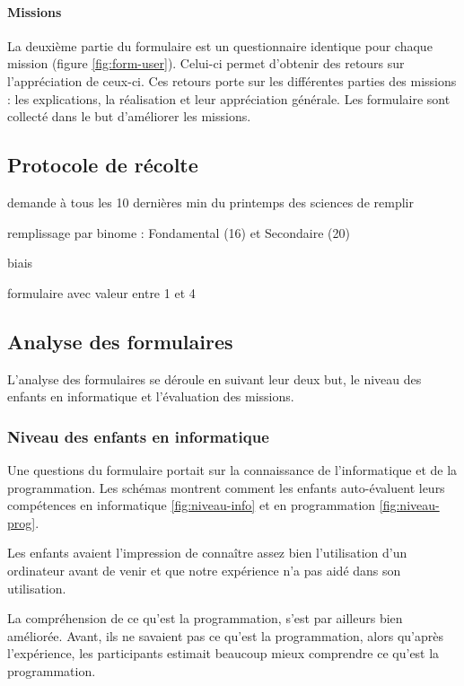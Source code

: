 \paragraph{Missions}
La deuxième partie du formulaire est un questionnaire identique pour chaque mission (figure \ref{fig:form-user}). Celui-ci permet d'obtenir des retours sur l'appréciation de ceux-ci. Ces retours porte sur les différentes parties des missions : les explications, la réalisation et leur appréciation générale. Les formulaire sont collecté dans le but d'améliorer les missions.

\subsection{Protocole de récolte}
demande à tous les 10 dernières min du printemps des sciences de remplir

remplissage par binome : Fondamental (16) et Secondaire (20)

biais

formulaire avec valeur entre 1 et 4

\subsection{Analyse des formulaires}
L'analyse des formulaires se déroule en suivant leur deux but, le niveau des enfants en informatique et l'évaluation des missions.

\subsubsection{Niveau des enfants en informatique}
Une questions du formulaire portait sur la connaissance de l'informatique et de la programmation. Les schémas montrent comment les enfants auto-évaluent leurs compétences en informatique \ref{fig:niveau-info} et en programmation \ref{fig:niveau-prog}.

Les enfants avaient l'impression de connaître assez bien l'utilisation d'un ordinateur avant de venir et que notre expérience n'a pas aidé dans son utilisation.

La compréhension de ce qu'est la programmation, s'est par ailleurs bien améliorée. Avant, ils ne savaient pas ce qu'est la programmation, alors qu'après l'expérience, les participants estimait beaucoup mieux comprendre ce qu'est la programmation. %

